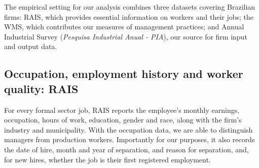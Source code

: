 
The empirical setting for our analysis combines three datasets covering Brazilian firms: RAIS, which provides essential information on workers and their jobs; the WMS, which contributes our measures of management practices; and Annual Industrial Survey (\textit{Pesquisa Industrial Anual - PIA}), our source for firm input and output data.

\subsection{Occupation, employment history and worker quality: RAIS}
For every formal sector job, RAIS reports the employee's monthly earnings, occupation, hours of work, education, gender and race, along with the firm's industry and municipality. With the occupation data, we are able to distinguish managers from production workers. Importantly for our purposes, it also records the date of hire, month and year of separation, and reason for separation, and, for new hires, whether the job is their first registered employment.


